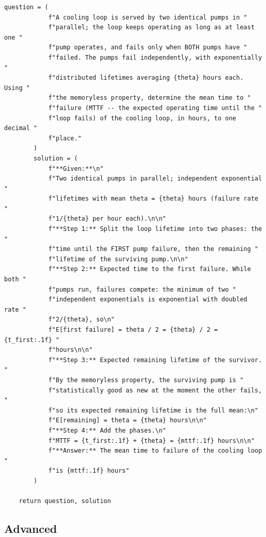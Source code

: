 \begin{lstlisting}[style=pythonstyle]
        question = (
            f"A cooling loop is served by two identical pumps in "
            f"parallel; the loop keeps operating as long as at least one "
            f"pump operates, and fails only when BOTH pumps have "
            f"failed. The pumps fail independently, with exponentially "
            f"distributed lifetimes averaging {theta} hours each. Using "
            f"the memoryless property, determine the mean time to "
            f"failure (MTTF -- the expected operating time until the "
            f"loop fails) of the cooling loop, in hours, to one decimal "
            f"place."
        )
        solution = (
            f"**Given:**\n"
            f"Two identical pumps in parallel; independent exponential "
            f"lifetimes with mean theta = {theta} hours (failure rate "
            f"1/{theta} per hour each).\n\n"
            f"**Step 1:** Split the loop lifetime into two phases: the "
            f"time until the FIRST pump failure, then the remaining "
            f"lifetime of the surviving pump.\n\n"
            f"**Step 2:** Expected time to the first failure. While both "
            f"pumps run, failures compete: the minimum of two "
            f"independent exponentials is exponential with doubled rate "
            f"2/{theta}, so\n"
            f"E[first failure] = theta / 2 = {theta} / 2 = {t_first:.1f} "
            f"hours\n\n"
            f"**Step 3:** Expected remaining lifetime of the survivor. "
            f"By the memoryless property, the surviving pump is "
            f"statistically good as new at the moment the other fails, "
            f"so its expected remaining lifetime is the full mean:\n"
            f"E[remaining] = theta = {theta} hours\n\n"
            f"**Step 4:** Add the phases.\n"
            f"MTTF = {t_first:.1f} + {theta} = {mttf:.1f} hours\n\n"
            f"**Answer:** The mean time to failure of the cooling loop "
            f"is {mttf:.1f} hours"
        )

    return question, solution
\end{lstlisting}


\vspace{6pt}

\subsection{Advanced}

\vspace{6pt}

